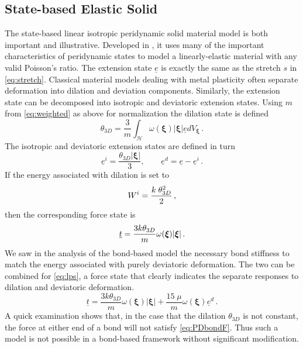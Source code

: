 \subsection{State-based Elastic Solid}
The state-based linear isotropic peridynamic solid material model is both important and illustrative.
Developed in \cite{silling2007peridynamic}, it uses many of the important characteristics of peridynamic states to model a linearly-elastic material with any valid Poisson's ratio.
The extension state $\underline{e}$ is exactly the same as the stretch $s$ in \cref{eq:stretch}.
Classical material models dealing with metal plasticity often separate deformation into dilation and deviation components.
Similarly, the extension state can be decomposed into isotropic and deviatoric extension states. Using $m$ from \cref{eq:weighted} as above for normalization the dilation state is defined
%
\begin{equation}
    \theta_{3D} = \frac{3}{m} \int_\mathcal{H} \omega(\boldsymbol{\xi}) |\boldsymbol{\xi}| \underline{e} dV_{\boldsymbol{\xi}}\, .
\end{equation}
%
The isotropic and deviatoric extension states are defined in turn
%
\begin{equation}
\underline{e}^i = \frac{\theta_{3D} |\boldsymbol{\xi}|}{3},\qquad \underline{e}^d = \underline{e}-\underline{e}^i\, .
\end{equation}
%
If the energy associated with dilation is set to
%
\begin{equation}
W^i = \frac{k\;\theta^2_{3D}}{2}\, ,\notag
\end{equation}
%
then the corresponding force state is
%
\begin{equation}
\underline{t} = \frac{3k\theta_{3D}}{m}\omega(\boldsymbol{\xi})|\boldsymbol{\xi}|\, .\notag
\end{equation}
%
We saw in the analysis of the bond-based model the necessary bond stiffness to match the energy associated with purely deviatoric deformation.
The two can be combined for \cref{eq:lps}, a force state that clearly indicates the separate responses to dilation and deviatoric deformation.
%
\begin{equation}
\label{eq:lps}
\underline{t} = \frac{3k\theta_{3D}}{m}\omega(\boldsymbol{\xi})|\boldsymbol{\xi}| + \frac{15\;\mu}{m}\omega(\boldsymbol{\xi})\underline{e}^d\, .
\end{equation}
%
A quick examination shows that, in the case that the dilation $\theta_{3D}$ is not constant, the force at either end of a bond will not satisfy \cref{eq:PDbondF}.
Thus such a model is not possible in a bond-based framework without significant modification. 

